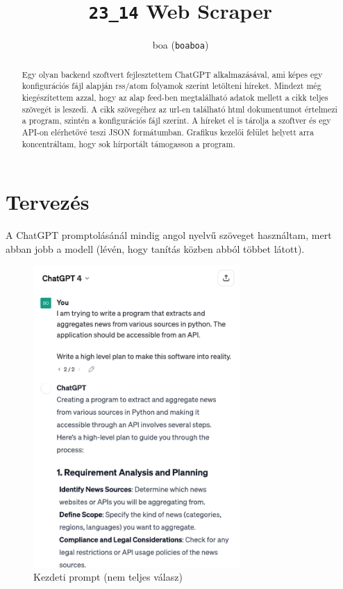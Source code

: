 \documentclass[]{article}
\title{\texttt{23\_14} Web Scraper}
\author{boa (\texttt{boaboa})}
\begin{document}
\maketitle

\begin{abstract}


Egy olyan backend szoftvert fejlesztettem ChatGPT alkalmazásával, ami képes egy konfigurációs fájl alapján rss/atom folyamok szerint letölteni híreket. Mindezt még kiegészítettem azzal, hogy az alap feed-ben megtalálható adatok mellett a cikk teljes szövegét is leszedi. A cikk szövegéhez az url-en található html dokumentumot értelmezi a program, szintén a konfigurációs fájl szerint. A híreket el is tárolja a szoftver és egy API-on elérhetővé teszi JSON formátumban. Grafikus kezelői felület helyett arra koncentráltam, hogy sok hírportált támogasson a program.

\end{abstract}

\pagebreak

\section{Tervezés}

A ChatGPT promptolásánál mindig angol nyelvű szöveget használtam, mert abban jobb a modell (lévén, hogy tanítás közben abból többet látott).

\begin{figure}[H]
	\centering
	\includegraphics[width=0.7\textwidth]{prompt_1.pdf}
	\caption{Kezdeti prompt (nem teljes válasz)}
\end{figure}
\end{document}
